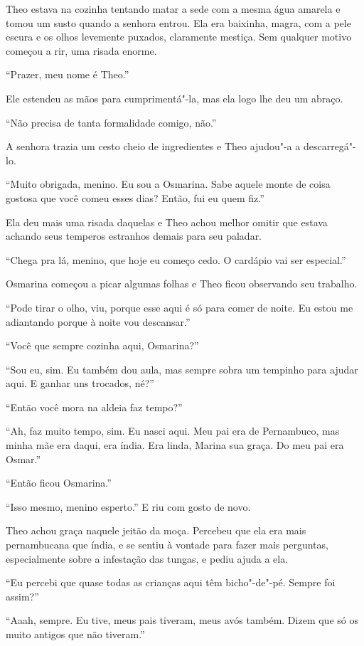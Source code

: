 Theo estava na cozinha tentando matar a sede com a mesma água amarela e
tomou um susto quando a senhora entrou. Ela era baixinha, magra, com a
pele escura e os olhos levemente puxados, claramente mestiça. Sem
qualquer motivo começou a rir, uma risada enorme.

``Prazer, meu nome é Theo.''

Ele estendeu as mãos para cumprimentá"-la, mas ela logo lhe deu um
abraço.

``Não precisa de tanta formalidade comigo, não.''

A senhora trazia um cesto cheio de ingredientes e Theo ajudou"-a a
descarregá"-lo.

``Muito obrigada, menino. Eu sou a Osmarina. Sabe aquele monte de coisa
gostosa que você comeu esses dias? Então, fui eu quem fiz.''

Ela deu mais uma risada daquelas e Theo achou melhor omitir que estava
achando seus temperos estranhos demais para seu paladar.

``Chega pra lá, menino, que hoje eu começo cedo. O cardápio vai ser
especial.''

Osmarina começou a picar algumas folhas e Theo ficou observando seu
trabalho.

``Pode tirar o olho, viu, porque esse aqui é só para comer de noite. Eu
estou me adiantando porque à noite vou descansar.''

``Você que sempre cozinha aqui, Osmarina?''

``Sou eu, sim. Eu também dou aula, mas sempre sobra um tempinho para
ajudar aqui. E ganhar uns trocados, né?''

``Então você mora na aldeia faz tempo?''

``Ah, faz muito tempo, sim. Eu nasci aqui. Meu pai era de Pernambuco,
mas minha mãe era daqui, era índia. Era linda, Marina sua graça. Do meu
pai era Osmar.''

``Então ficou Osmarina.''

``Isso mesmo, menino esperto.'' E riu com gosto de novo.

Theo achou graça naquele jeitão da moça. Percebeu que ela era mais
pernambucana que índia, e se sentiu à vontade para fazer mais perguntas,
especialmente sobre a infestação das tungas, e pediu ajuda a ela.

``Eu percebi que quase todas as crianças aqui têm bicho"-de"-pé. Sempre
foi assim?''

``Aaah, sempre. Eu tive, meus pais tiveram, meus avós também. Dizem que
só os muito antigos que não tiveram.''

